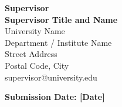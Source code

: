 \begin{titlepage}
    \vspace{1cm}
    \begin{minipage}{0.75\textwidth}
        \raggedright
        { \textbf{Supervisor}\\[0.4em] \small
        \textbf{Supervisor Title and Name}\\
        University Name\\
        Department / Institute Name\\
        Street Address\\
        Postal Code, City\\
        supervisor@university.edu}
    \end{minipage}

    \vspace{1cm}
    \textbf{Submission Date: [Date]}

\end{titlepage}